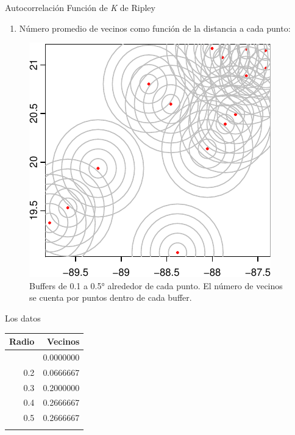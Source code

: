 \documentclass[
  11pt,
  ignorenonframetext,
]{beamer}
\providecommand{\tightlist}{%
  \setlength{\itemsep}{0pt}\setlength{\parskip}{0pt}}
\begin{document}
\begin{frame}{Autocorrelación}
\protect\hypertarget{autocorrelaciuxf3n}{}
Función de \emph{K} de Ripley

\begin{enumerate}
\tightlist
\item
  Número promedio de vecinos como función de la distancia a cada punto:
\end{enumerate}

\begin{figure}

{\centering \includegraphics{Tutorial-spatstat-2_files/figure-beamer/unnamed-chunk-5-1} 

}

\caption{Buffers  de 0.1 a 0.5° alrededor de cada punto. El número de vecinos se cuenta por puntos dentro de cada buffer.}\label{fig:unnamed-chunk-5}
\end{figure}
\end{frame}

\begin{frame}{Los datos}
\protect\hypertarget{los-datos}{}
\begin{longtable}[]{@{}rr@{}}
\toprule\noalign{}
Radio & Vecinos \\
\midrule\noalign{}
\endhead
0.1 & 0.0000000 \\
0.2 & 0.0666667 \\
0.3 & 0.2000000 \\
0.4 & 0.2666667 \\
0.5 & 0.2666667 \\
\bottomrule\noalign{}
\end{longtable}
\end{frame}
\end{document}
